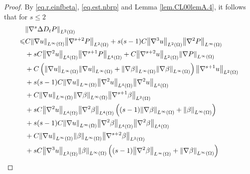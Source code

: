 \documentclass[12pt,reqno]{amsart}
\numberwithin{equation}{section}
\theoremstyle{definition}
\theoremstyle{remark}
\begin{document}
\begin{proof}
By \eqref{eq.r.einfbeta}, \eqref{eq.est.nbrp} and Lemma \ref{lem.CL00lemA.4}, it follows that for $s{\leqslant} 2$
\begin{align}\label{eq.est.nbdtp}
  &{\left\Vert{{\nabla}^s\Delta D_t{P }}\right\Vert}_{L^2(\Omega)}{\nonumber}\\
  {\leqslant}&C{\left\Vert{{\nabla}  u}\right\Vert}_{L^\infty(\Omega)}{\left\Vert{{\nabla}^{s+2} {P }}\right\Vert}_{L^2(\Omega)}+s(s-1)C{\left\Vert{{\nabla}^3 u}\right\Vert}_{L^2(\Omega)}{\left\Vert{{\nabla}^2 {P }}\right\Vert}_{L^\infty(\Omega)}{\nonumber}\\
  &+sC{\left\Vert{ {\nabla}^2 u}\right\Vert}_{L^4(\Omega)}{\left\Vert{{\nabla}^{s+1} {P }}\right\Vert}_{L^4(\Omega)}+C{\left\Vert{{\nabla}^{s+2} u}\right\Vert}_{L^2(\Omega)}{\left\Vert{{\nabla}  {P }}\right\Vert}_{L^\infty(\Omega)}{\nonumber}\\
  &+C\left({\left\Vert{{\nabla} u}\right\Vert}_{L^\infty(\Omega)}{\left\Vert{{\nabla} u}\right\Vert}_{L^\infty(\Omega)}+{\left\Vert{{\nabla} \beta}\right\Vert}_{L^\infty(\Omega)}{\left\Vert{{\nabla} \beta}\right\Vert}_{L^\infty(\Omega)}\right) {\left\Vert{{\nabla}^{s+1} u}\right\Vert}_{L^2(\Omega)}{\nonumber}\\
  &+s(s-1)C{\left\Vert{{\nabla} u}\right\Vert}_{L^\infty(\Omega)}{\left\Vert{{\nabla}^2 u}\right\Vert}_{L^4(\Omega)} {\left\Vert{{\nabla}^2 u}\right\Vert}_{L^4(\Omega)}{\nonumber}\\
  &+C{\left\Vert{{\nabla} u}\right\Vert}_{L^\infty(\Omega)}{\left\Vert{{\nabla} \beta}\right\Vert}_{L^\infty(\Omega)}{\left\Vert{{\nabla}^{s+1} \beta}\right\Vert}_{L^2(\Omega)}{\nonumber}\\
  &+sC{\left\Vert{{\nabla}^2 u}\right\Vert}_{L^4(\Omega)}{\left\Vert{{\nabla}^2 \beta}\right\Vert}_{L^4(\Omega)} \left((s-1){\left\Vert{{\nabla}  \beta}\right\Vert}_{L^\infty(\Omega)}+{\left\Vert{\beta}\right\Vert}_{L^\infty(\Omega)}\right){\nonumber}\\
  &+s(s-1)C{\left\Vert{{\nabla} u}\right\Vert}_{L^\infty(\Omega)}{\left\Vert{{\nabla}^2 \beta}\right\Vert}_{L^4(\Omega)} {\left\Vert{{\nabla}^2  \beta}\right\Vert}_{L^4(\Omega)}{\nonumber}\\
  &+C{\left\Vert{{\nabla} u}\right\Vert}_{L^\infty(\Omega)}{\left\Vert{\beta}\right\Vert}_{L^\infty(\Omega)} {\left\Vert{{\nabla}^{s+2} \beta}\right\Vert}_{L^2(\Omega)}{\nonumber}\\
  &+sC{\left\Vert{{\nabla}^3 u}\right\Vert}_{L^2(\Omega)}{\left\Vert{\beta}\right\Vert}_{L^\infty(\Omega)} \left((s-1){\left\Vert{{\nabla}^{2} \beta}\right\Vert}_{L^\infty(\Omega)}+{\left\Vert{{\nabla} \beta}\right\Vert}_{L^\infty(\Omega)}\right){\nonumber}\\

\end{align}
\end{proof}
\end{document}
